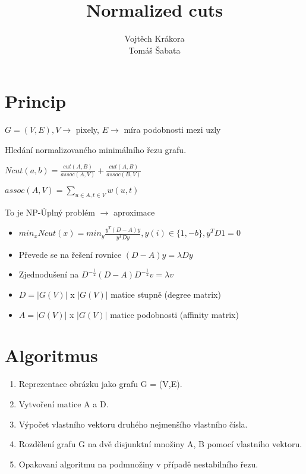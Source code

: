 \documentclass[11pt]{beamer}
\author{Vojtěch Krákora \\ Tomáš Šabata}
\title[\hspace{50mm} \insertframenumber/\inserttotalframenumber]{Normalized cuts}
\institute{České vysoké učení technické v Praze}
\date{}
\begin{document}
\begin{frame}
\titlepage
\end{frame}

\begin{frame}
\tableofcontents
\end{frame}

\section{Princip}
\begin{frame}
\begin{itemize}
\item $G=(V,E), V \rightarrow$ pixely, $E \rightarrow$ míra podobnosti mezi uzly
\item Hledání normalizovaného minimálního řezu grafu.

\begin{center}
\item
$Ncut(a,b)=\frac{cut(A,B)}{assoc(A,V)}+\frac{cut(A,B)}{assoc(B,V)}$

$ assoc(A,V)=\sum_{u\in A, t\in V} w(u,t)$

\end{center}
\item To je NP-Úplný problém $\rightarrow$ aproximace
\end{itemize}
\end{frame}

\begin{frame}
\begin{itemize}
\item $min_xNcut(x)=min_y\frac{y^T(D-A)y}{y^TDy}, y(i)\in\{1,-b\},y^TD1=0$
\item Převede se na řešení rovnice $(D-A)y=\lambda Dy$
\item Zjednodušení na $D^{-\frac{1}{2}}(D-A)D^{-\frac{1}{2}}v=\lambda v$
\item $D=|G(V)|$ x $|G(V)|$ matice stupně (degree matrix)
\item $A=|G(V)|$ x $|G(V)|$ matice podobnosti (affinity matrix)
\end{itemize}
\end{frame}
\section{Algoritmus}
\begin{frame}
\begin{enumerate}
\item Reprezentace obrázku jako grafu G = (V,E).
\item Vytvoření matice A a D.
\item Výpočet vlastního vektoru druhého nejmenšího vlastního čísla.
\item Rozdělení grafu G na dvě disjunktní množiny A, B pomocí vlastního vektoru.
\item Opakovaní algoritmu na podmnožiny v případě nestabilního řezu.
\end{enumerate}

\end{frame}
\end{document}
